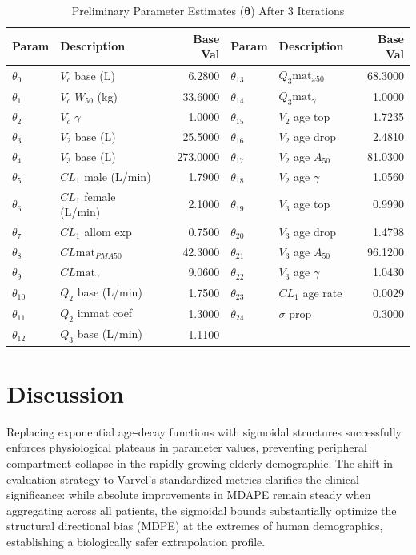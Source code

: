\documentclass[12pt,a4paper]{article}
\begin{document}
\begin{table}[ht]
\centering
\caption{Preliminary Parameter Estimates ($\boldsymbol{\theta}$) After 3 Iterations}
\label{tab:params}
\begin{tabular}{llr|llr}
\toprule
\textbf{Param} & \textbf{Description} & \textbf{Base Val} & \textbf{Param} & \textbf{Description} & \textbf{Base Val} \\
\midrule
$\theta_{0}$ & $V_c$ base (L) & 6.2800 & $\theta_{13}$ & $Q_{3} \text{mat}_{x50}$ & 68.3000 \\
$\theta_{1}$ & $V_c$ $W_{50}$ (kg) & 33.6000 & $\theta_{14}$ & $Q_{3} \text{mat}_\gamma$ & 1.0000 \\
$\theta_{2}$ & $V_c$ $\gamma$ & 1.0000 & $\theta_{15}$ & $V_2$ age top & 1.7235 \\
$\theta_{3}$ & $V_2$ base (L) & 25.5000 & $\theta_{16}$ & $V_2$ age drop & 2.4810 \\
$\theta_{4}$ & $V_3$ base (L) & 273.0000 & $\theta_{17}$ & $V_2$ age $A_{50}$ & 81.0300 \\
$\theta_{5}$ & $CL_1$ male (L/min) & 1.7900 & $\theta_{18}$ & $V_2$ age $\gamma$ & 1.0560 \\
$\theta_{6}$ & $CL_1$ female (L/min)& 2.1000 & $\theta_{19}$ & $V_3$ age top & 0.9990 \\
$\theta_{7}$ & $CL_1$ allom exp & 0.7500 & $\theta_{20}$ & $V_3$ age drop & 1.4798 \\
$\theta_{8}$ & $CL\text{mat}_{PMA50}$ & 42.3000 & $\theta_{21}$ & $V_3$ age $A_{50}$ & 96.1200 \\
$\theta_{9}$ & $CL\text{mat}_\gamma$ & 9.0600 & $\theta_{22}$ & $V_3$ age $\gamma$ & 1.0430 \\
$\theta_{10}$ & $Q_2$ base (L/min) & 1.7500 & $\theta_{23}$ & $CL_1$ age rate & 0.0029 \\
$\theta_{11}$ & $Q_2$ immat coef & 1.3000 & $\theta_{24}$ & $\sigma$ prop & 0.3000 \\
$\theta_{12}$ & $Q_3$ base (L/min) & 1.1100 & & & \\
\bottomrule
\end{tabular}
\end{table}

\section{Discussion}
Replacing exponential age-decay functions with sigmoidal structures successfully enforces physiological plateaus in parameter values, preventing peripheral compartment collapse in the rapidly-growing elderly demographic. The shift in evaluation strategy to Varvel's standardized metrics clarifies the clinical significance: while absolute improvements in MDAPE remain steady when aggregating across all patients, the sigmoidal bounds substantially optimize the structural directional bias (MDPE) at the extremes of human demographics, establishing a biologically safer extrapolation profile.
\end{document}
